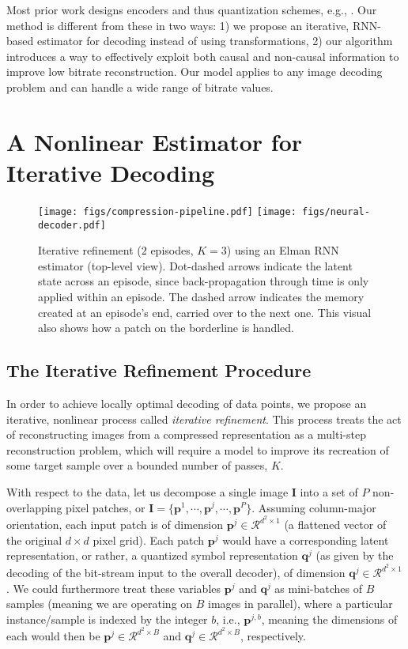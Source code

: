 \documentclass[smallabstract,smallcaptions]{dccpaper}
\begin{document}
Most prior work designs encoders and thus quantization schemes, e.g., \cite{toderici2015}. Our method is different from these in two ways: 1) we propose an iterative, RNN-based estimator for decoding instead of using transformations, 2) our algorithm introduces a way to effectively exploit both causal and non-causal
information to improve low bitrate reconstruction. Our model applies to any image decoding problem and can handle a wide range of bitrate values.

\section{A Nonlinear Estimator for Iterative Decoding}
\label{iterative_refinement}

\begin{figure}[t]
\centering
\texttt{[image: figs/compression-pipeline.pdf]}
\texttt{[image: figs/neural-decoder.pdf]}
\caption{Iterative refinement ($2$ episodes, $K=3$) using an Elman RNN estimator (top-level view).
Dot-dashed arrows indicate the latent state across an episode, since back-propagation through time is only applied within an episode. The dashed arrow indicates the memory created at an episode's end, carried over to the next one. This visual also shows how a patch on the borderline is handled.}
\label{fig:sysarch}
\end{figure}

\subsection{The Iterative Refinement Procedure}
\label{refinement}
In order to achieve locally optimal decoding of data points, we propose an iterative, nonlinear process called \emph{iterative refinement}. This process treats the act of reconstructing images from a compressed representation as a multi-step reconstruction problem, which will require a model to improve its recreation of some target sample over a bounded number of passes, $K$.

With respect to the data, let us decompose a single image $\mathbf{I}$ into a set of $P$ non-overlapping pixel patches, or $\mathbf{I} = \{ \mathbf{p}^1,\cdots,\mathbf{p}^j,\cdots,\mathbf{p}^P \}$. Assuming column-major orientation, each input patch is of dimension $\mathbf{p}^j \in \mathcal{R}^{d^2 \times 1}$ (a flattened vector of the original $d \times d$ pixel grid). Each patch $\mathbf{p}^j$ would have a corresponding latent representation, or rather, a quantized symbol representation $\mathbf{q}^j$ (as given by the decoding of the bit-stream input to the overall decoder), of dimension $\mathbf{q}^j \in \mathcal{R}^{d^2 \times 1}$. We could furthermore treat these variables $\mathbf{p}^j$ and $\mathbf{q}^j$ as mini-batches of $B$ samples (meaning we are operating on $B$ images in parallel), where a particular instance/sample is indexed by the integer $b$, i.e., $\mathbf{p}^{j,b}$, meaning the dimensions of each would then be $\mathbf{p}^j \in \mathcal{R}^{d^2 \times B}$ and $\mathbf{q}^j \in \mathcal{R}^{d^2 \times B}$, respectively.
\end{document}
